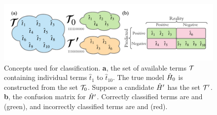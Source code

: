 \begin{figure}
    \begin{center}
        \includegraphics[width=\textwidth]{theoretical_study/figures/classication_example.pdf}
    \end{center}
    \caption[Classification concepts]{
        Concepts used for classification. 
        \textbf{a}, the set of available terms ${ \mathcal{T} }$ containing individual terms $\hat{t}_1$ to $\hat{t}_{10}$. 
        The true model $\hat{H}_0$ is constructed from the set ${ \mathcal{T} }_0$. 
        Suppose a candidate $\hat{H}^{\prime}$ has the set ${ \mathcal{T} }^{\prime}$. 
        \textbf{b}, the confusion matrix for $\hat{H}^{\prime}$. Correctly classified terms are  and  (green), 
            and incorrectly classified terms are  and  (red). 
    }
    \label{fig:classification_eg}
\end{figure}



